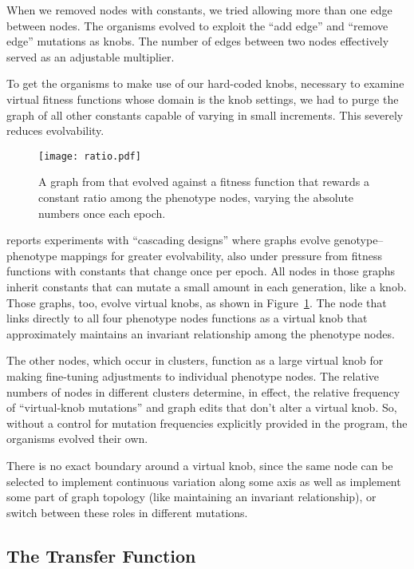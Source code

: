 \documentclass[letterpaper]{article}
\begin{document}
When we removed nodes with constants, we tried allowing more than one edge
between nodes. The organisms evolved to exploit the ``add edge'' and ``remove
edge'' mutations as knobs. The number of edges between two nodes effectively
served as an adjustable multiplier.

To get the organisms to make use of our hard-coded knobs, necessary to examine
virtual fitness functions whose domain is the knob settings, we had to purge
the graph of all other constants capable of varying in small increments. This
severely reduces evolvability.

\begin{figure}[b]
  \centering
  \texttt{[image: ratio.pdf]}
  \caption{A graph from \citet{kovitz2015experiments} that evolved against a
    fitness function that rewards a constant ratio among the phenotype nodes,
  varying the absolute numbers once each epoch.}
  \label{fig:virtual-knob}
\end{figure}

\citet{kovitz2015experiments} reports experiments with ``cascading designs''
where graphs evolve genotype--phenotype mappings for greater evolvability, also
under pressure from fitness functions with constants that change once per epoch.
All nodes in those graphs inherit constants that can mutate a small amount in
each generation, like a knob. Those graphs, too, evolve virtual knobs, as shown
in Figure~\ref{fig:virtual-knob}. The node that links directly to all four phenotype nodes functions
as a virtual knob that approximately maintains an invariant relationship
among the phenotype nodes.

The other nodes, which occur in clusters, function as a large virtual knob for
making fine-tuning adjustments to individual phenotype nodes.  The relative
numbers of nodes in different clusters determine, in effect, the relative
frequency of ``virtual-knob mutations'' and graph edits that don't alter a
virtual knob. So, without a control for mutation frequencies explicitly provided
in the program, the organisms evolved their own.

There is no exact boundary around a virtual knob, since the same node can be
selected to implement continuous variation along some axis as well as implement
some part of graph topology (like maintaining an invariant relationship), or
switch between these roles in different mutations.

\subsection{The Transfer Function}
\end{document}
